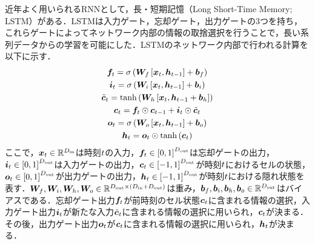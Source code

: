 近年よく用いられるRNNとして，長・短期記憶（Long Short-Time Memory; LSTM）\cite{hochreiter1997long}がある．LSTMは入力ゲート，忘却ゲート，出力ゲートの3つを持ち，これらゲートによってネットワーク内部の情報の取捨選択を行うことで，長い系列データからの学習を可能にした．LSTMのネットワーク内部で行われる計算を以下に示す．
\begin{gather}
    \bm{f}_{t} = \sigma\left(\bm{W}_{f}\left[\bm{x}_{t}, \bm{h}_{t-1}\right] + \bm{b}_{f}\right) \\
    \bm{i}_{t} = \sigma\left(\bm{W}_{i}\left[\bm{x}_{t}, \bm{h}_{t-1}\right] + \bm{b}_{i}\right) \\
    \tilde{\bm{c}}_{t} = \tanh\left(\bm{W}_{h}\left[\bm{x}_{t}, \bm{h}_{t-1} + \bm{b}_{h}\right]\right) \\
    \bm{c}_{t} = \bm{f}_{t} \odot \bm{c}_{t-1} + \bm{i}_{t} \odot \tilde{\bm{c}}_{t} \\
    \bm{o}_{t} = \sigma\left(\bm{W}_{o}\left[\bm{x}_{t}, \bm{h}_{t-1}\right] + \bm{b}_{o}\right) \\
    \bm{h}_{t} = \bm{o}_{t} \odot \tanh\left(\bm{c}_{t}\right)
\end{gather}
ここで，$\bm{x}_{t} \in \mathbb{R}^{D_{\text{in}}}$は時刻$t$の入力，$\bm{f}_{t} \in \left[0, 1\right]^{D_{\text{out}}}$は忘却ゲートの出力，$\bm{i}_{t} \in \left[0, 1\right]^{D_{\text{out}}}$は入力ゲートの出力，$\bm{c}_{t} \in \left[-1, 1\right]^{D_{\text{out}}}$が時刻$t$におけるセルの状態，$\bm{o}_{t} \in \left[0, 1\right]^{D_{\text{out}}}$が出力ゲートの出力，$\bm{h}_{t} \in \left[-1, 1\right]^{D_{\text{out}}}$が時刻$t$における隠れ状態を表す．$\bm{W}_{f}, \bm{W}_{i}, \bm{W}_{h}, \bm{W}_{o} \in \mathbb{R}^{D_{\text{out}} \times \left(D_{\text{in}} + D_{\text{out}}\right)}$は重み，$\bm{b}_{f}, \bm{b}_{i}, \bm{b}_{h}, \bm{b}_{o} \in \mathbb{R}^{D_{\text{out}}}$はバイアスである．忘却ゲート出力$\bm{f}_{t}$が前時刻のセル状態$\bm{c}_{t}$に含まれる情報の選択，入力ゲート出力$\bm{i}_{t}$が新たな入力$\tilde{\bm{c}}_{t}$に含まれる情報の選択に用いられ，$\bm{c}_{t}$が決まる．その後，出力ゲート出力$\bm{o}_{t}$が$\bm{c}_{t}$に含まれる情報の選択に用いられ，$\bm{h}_{t}$が決まる．

